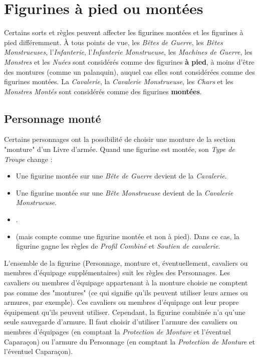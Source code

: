 \section{Figurines à pied ou montées}

Certains sorts et règles peuvent affecter les figurines montées et les figurines à pied différemment. À tous points de vue, les \emph{Bêtes de Guerre}, les \emph{Bêtes Monstrueuses}, l'\emph{Infanterie}, l'\emph{Infanterie Monstrueuse}, les \emph{Machines de Guerre}, les \emph{Monstres} et les \emph{Nuées} sont considérés comme des figurines \textbf{à pied}, à moins d'être des montures (comme un palanquin), auquel cas elles sont considérées comme des figurines montées. La \emph{Cavalerie}, la \emph{Cavalerie Monstrueuse}, les \emph{Chars} et les \emph{Monstres Montés} sont considérés comme des figurines \textbf{montées}.

\subsection{Personnage monté}
Certains personnages ont la possibilité de choisir une monture de la section "monture" d'un Livre d'armée. Quand une figurine est montée, son \emph{Type de Troupe} change :
\begin{itemize}[label={-}]
\item Une figurine montée sur une \emph{Bête de Guerre} devient de la \emph{Cavalerie}.
\item Une figurine montée sur une \emph{Bête Monstrueuse} devient de la \emph{Cavalerie Monstrueuse}.
\item {}.
\item {} (mais compte comme une figurine montée et non à pied). Dans ce cas, la figurine gagne les règles de \emph{Profil Combiné} et \emph{Soutien de cavalerie}.
\end{itemize}
L'ensemble de la figurine (Personnage, monture et, éventuellement, cavaliers ou membres d'équipage supplémentaires) suit les règles des Personnages. Les cavaliers ou membres d'équipage appartenant à la monture choisie ne comptent pas comme des "montures" (ce qui signifie qu'ils peuvent utiliser leurs armes ou armures, par exemple). Ces cavaliers ou membres d'équipage ont leur propre équipement qu'ils peuvent utiliser. Cependant, la figurine combinée n'a qu'une seule sauvegarde d'armure. Il faut choisir d'utiliser l'armure des cavaliers ou membres d'équipages (en comptant la \emph{Protection de Monture} et l'éventuel Caparaçon) ou l'armure du Personnage (en comptant la \emph{Protection de Monture} et l'éventuel Caparaçon).

